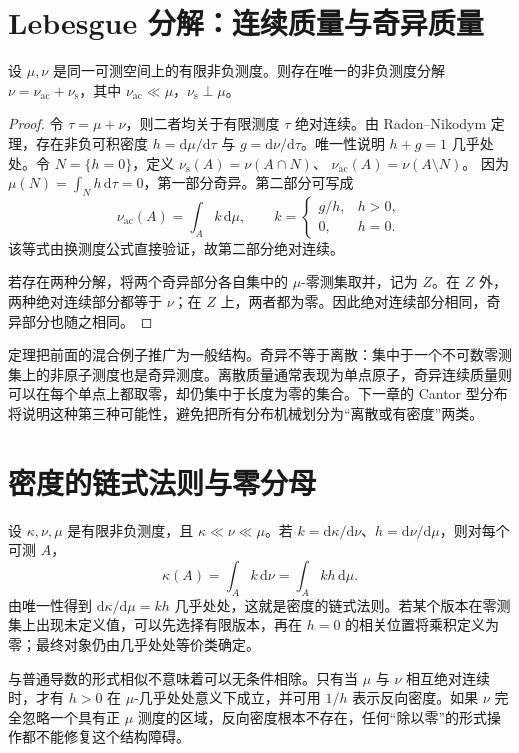 \documentclass[UTF8,12pt,a4paper,fontset=fandol]{ctexbook}
\begin{document}
\section{Lebesgue 分解：连续质量与奇异质量}
\begin{theorem}
设 $\mu,\nu$ 是同一可测空间上的有限非负测度。则存在唯一的非负测度分解
$\nu=\nu_{\mathrm{ac}}+\nu_{\mathrm{s}}$，其中
$\nu_{\mathrm{ac}}\ll\mu$，$\nu_{\mathrm{s}}\perp\mu$。
\label{thm:mt-lebesgue-decomposition}
\end{theorem}
\begin{proof}
令 $\tau=\mu+\nu$，则二者均关于有限测度 $\tau$ 绝对连续。由 Radon--Nikodym 定理，存在非负可积密度 $h=\mathrm d\mu/\mathrm d\tau$ 与 $g=\mathrm d\nu/\mathrm d\tau$。唯一性说明 $h+g=1$ 几乎处处。令 $N=\{h=0\}$，定义
$\nu_{\mathrm s}(A)=\nu(A\cap N)$、
$\nu_{\mathrm{ac}}(A)=\nu(A\setminus N)$。
因为 $\mu(N)=\int_Nh\,\mathrm d\tau=0$，第一部分奇异。第二部分可写成
\[
 \nu_{\mathrm{ac}}(A)=\int_A k\,\mathrm d\mu,\qquad
 k=\begin{cases}g/h,&h>0,\\0,&h=0.\end{cases}
\]
该等式由换测度公式直接验证，故第二部分绝对连续。

若存在两种分解，将两个奇异部分各自集中的 $\mu$-零测集取并，记为 $Z$。在 $Z$ 外，两种绝对连续部分都等于 $\nu$；在 $Z$ 上，两者都为零。因此绝对连续部分相同，奇异部分也随之相同。
\end{proof}

定理把前面的混合例子推广为一般结构。奇异不等于离散：集中于一个不可数零测集上的非原子测度也是奇异测度。离散质量通常表现为单点原子，奇异连续质量则可以在每个单点上都取零，却仍集中于长度为零的集合。下一章的 Cantor 型分布将说明这种第三种可能性，避免把所有分布机械划分为“离散或有密度”两类。

\section{密度的链式法则与零分母}
设 $\kappa,\nu,\mu$ 是有限非负测度，且 $\kappa\ll\nu\ll\mu$。若 $k=\mathrm d\kappa/\mathrm d\nu$、$h=\mathrm d\nu/\mathrm d\mu$，则对每个可测 $A$，
\[
 \kappa(A)=\int_Ak\,\mathrm d\nu=\int_Akh\,\mathrm d\mu.
\]
由唯一性得到 $\mathrm d\kappa/\mathrm d\mu=kh$ 几乎处处，这就是密度的链式法则。若某个版本在零测集上出现未定义值，可以先选择有限版本，再在 $h=0$ 的相关位置将乘积定义为零；最终对象仍由几乎处处等价类确定。

与普通导数的形式相似不意味着可以无条件相除。只有当 $\mu$ 与 $\nu$ 相互绝对连续时，才有 $h>0$ 在 $\mu$-几乎处处意义下成立，并可用 $1/h$ 表示反向密度。如果 $\nu$ 完全忽略一个具有正 $\mu$ 测度的区域，反向密度根本不存在，任何“除以零”的形式操作都不能修复这个结构障碍。
\end{document}
